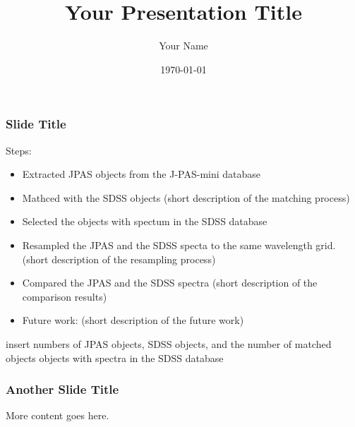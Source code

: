 \documentclass{beamer}
\title{Your Presentation Title}
\author{Your Name}
\date{\today}
\begin{document}
\frame{\titlepage}

\begin{frame}
\frametitle{Slide Title}
Steps:
\begin{itemize}
    \item Extracted JPAS objects from the J-PAS-mini database 
    \item Mathced with the SDSS objects (short description of the matching process)
    \item Selected the objects with spectum in the SDSS database
    \item Resampled the JPAS and the SDSS specta to the same wavelength grid. (short description of the resampling process)
    \item Compared the JPAS and the SDSS spectra (short description of the comparison results)
    \item Future work: (short description of the future work)
\end{itemize}

insert numbers of JPAS objects, SDSS objects, and the number of matched objects
objects with spectra in the SDSS database

\end{frame}

\begin{frame}
\frametitle{Another Slide Title}
More content goes here.
\end{frame}
\end{document}

